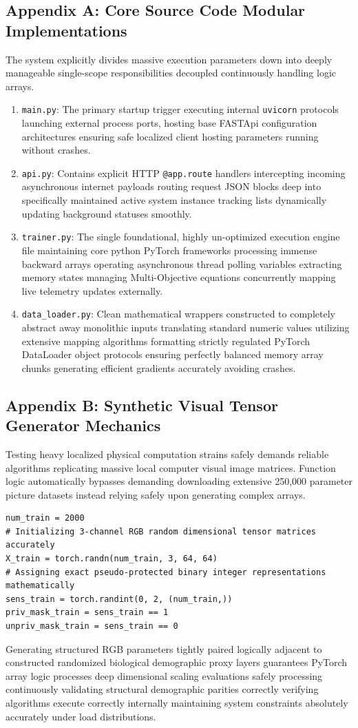 \documentclass[12pt,a4paper]{article}
\begin{document}
\subsection{Appendix A: Core Source Code Modular Implementations}
The system explicitly divides massive execution parameters down into deeply manageable single-scope responsibilities decoupled continuously handling logic arrays. 
\begin{enumerate}
    \item \texttt{main.py}: The primary startup trigger executing internal \texttt{uvicorn} protocols launching external process ports, hosting base FASTApi configuration architectures ensuring safe localized client hosting parameters running without crashes.
    \item \texttt{api.py}: Contains explicit HTTP \texttt{@app.route} handlers intercepting incoming asynchronous internet payloads routing request JSON blocks deep into specifically maintained active system instance tracking lists dynamically updating background statuses smoothly. 
    \item \texttt{trainer.py}: The single foundational, highly un-optimized execution engine file maintaining core python PyTorch frameworks processing immense backward arrays operating asynchronous thread polling variables extracting memory states managing Multi-Objective equations concurrently mapping live telemetry updates externally.
    \item \texttt{data\_loader.py}: Clean mathematical wrappers constructed to completely abstract away monolithic inputs translating standard numeric values utilizing extensive mapping algorithms formatting strictly regulated PyTorch DataLoader object protocols ensuring perfectly balanced memory array chunks generating efficient gradients accurately avoiding crashes.
\end{enumerate}

\subsection{Appendix B: Synthetic Visual Tensor Generator Mechanics}
Testing heavy localized physical computation strains safely demands reliable algorithms replicating massive local computer visual image matrices. Function logic automatically bypasses demanding downloading extensive 250,000 parameter picture datasets instead relying safely upon generating complex arrays.
\begin{verbatim}
num_train = 2000
# Initializing 3-channel RGB random dimensional tensor matrices accurately 
X_train = torch.randn(num_train, 3, 64, 64)
# Assigning exact pseudo-protected binary integer representations mathematically  
sens_train = torch.randint(0, 2, (num_train,))
priv_mask_train = sens_train == 1
unpriv_mask_train = sens_train == 0
\end{verbatim}
Generating structured RGB parameters tightly paired logically adjacent to constructed randomized biological demographic proxy layers guarantees PyTorch array logic processes deep dimensional scaling evaluations safely processing continuously validating structural demographic parities correctly verifying algorithms execute correctly internally maintaining system constraints absolutely accurately under load distributions.
\end{document}
